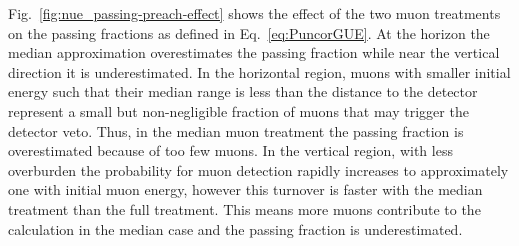 Fig.~\ref{fig:nue_passing-preach-effect} shows the effect of the two muon treatments on the passing fractions as defined in Eq.~\ref{eq:PuncorGUE}.
At the horizon the median approximation overestimates the passing fraction while near the vertical direction it is underestimated.
In the horizontal region, muons with smaller initial energy such that their median range is less than the distance to the detector represent a small but non-negligible fraction of muons that may trigger the detector veto.
Thus, in the median muon treatment the passing fraction is overestimated because of too few muons.
In the vertical region, with less overburden the probability for muon detection rapidly increases to approximately one with initial muon energy, however this turnover is faster with the median treatment than the full treatment.
This means more muons contribute to the calculation in the median case and the passing fraction is underestimated.

